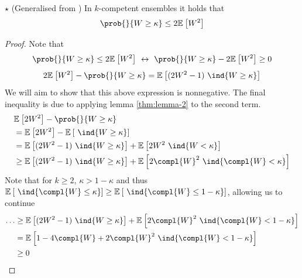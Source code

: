 \documentclass[../main.tex]{subfiles}
\begin{document}
\begin{lemma} $\star$ (Generalised from \cite{theisen_WhenAreEnsembles_2023}) In $k$-competent ensembles it holds that
\label{thm:lemma-claim}
$$
\prob{}{W \geq \kappa} \leq 2 \mathbb{E}_{}\left[ W^2 \right] 
$$
\end{lemma}
\begin{proof}
Note that
$$
\prob{}{W \geq \kappa} \leq 2 \mathbb{E}_{}\left[ W^2 \right] ~\leftrightarrow~ 
\prob{}{W \geq \kappa} - 2 \mathbb{E}_{}\left[ W^2 \right] \geq 0
$$
$$
2\mathbb{E}_{}\left[ W^2 \right] - \prob{}{W \geq \kappa} = 
\mathbb{E}_{}\left[ (2W^2-1)~\ind{W \geq \kappa} \right]
$$
We will aim to show that this above expression is nonnegative.
The  final inequality is due to applying lemma \ref{thm:lemma-2} to the second term.
\begin{align*}
& \mathbb{E}_{}\left[ 2W^2 \right]  - \prob{}{W \geq \kappa}  \\
&= \mathbb{E}_{}\left[ 2W^2 \right]  - \mathbb{E}_{}\left[ ~\ind{W \geq \kappa} \right]  \\
&= \mathbb{E}_{}\left[ (2W^2 - 1) ~\ind{W \geq \kappa} \right]  + \mathbb{E}_{}\left[ 2W^2 ~\ind{W < \kappa} \right] \\
& \geq  \mathbb{E}_{}\left[ (2W^2 - 1) ~\ind{W \geq \kappa} \right]  + \mathbb{E}_{}\left[ 2\compl{W} ^2 ~\ind{\compl{W}  < \kappa} \right] 
\end{align*}
Note that for $k \geq 2$, $\kappa > 1-\kappa$ and thus $\mathbb{E}_{}\left[ ~\ind{\compl{W} \leq \kappa} \right] \geq \mathbb{E}_{}\left[ ~\ind{\compl{W} \leq 1 - \kappa} \right]$, allowing us to continue
\begin{align*}
\dots &\geq 
\mathbb{E}_{}\left[ (2W^2 - 1) ~\ind{W \geq \kappa} \right]  + \mathbb{E}_{}\left[ 2\compl{W} ^2 ~\ind{\compl{W}  < 1-\kappa} \right]  \\
&= \mathbb{E}_{}\left[ 1-4 \compl{W} + 2 \compl{W}^2 ~\ind{\compl{W} < 1-\kappa }  \right]  \\
& \geq 0
\end{align*}
\end{proof}

\end{document}
